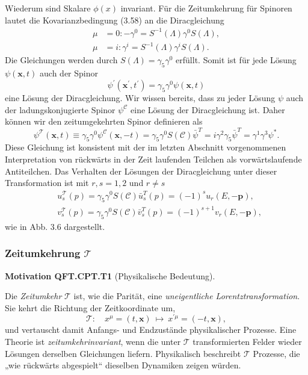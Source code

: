 \documentclass[10pt, letterpaper]{article}
\newcommand{\CustomHeading}[3]{%
  \par\medskip\noindent%
  \textbf{#1 #2} \textnormal{(#3)}.\enskip%
}
\newenvironment{MOT}[2]{\begin{unitbox}\CustomHeading{Motivation}{#1}{#2}}{\end{unitbox}}
\begin{document}
Wiederum sind Skalare $\phi(x)$ invariant. Für die Zeitumkehrung für Spinoren lautet die Kovarianzbedingung (3.58) an die Diracgleichung
$$
\begin{aligned}
\mu & =0:-\gamma^{0}=S^{-1}(\Lambda) \gamma^{0} S(\Lambda), \\
\mu & =i: \gamma^{i}=S^{-1}(\Lambda) \gamma^{i} S(\Lambda) .
\end{aligned}
$$
Die Gleichungen werden durch $S(\Lambda)=\gamma_{5} \gamma^{0}$ erfüllt. Somit ist für jede Lösung $\psi(\mathbf{x}, t)$ auch der Spinor
$$
\psi^{\prime}\left(\mathbf{x}^{\prime}, t^{\prime}\right)=\gamma_{5} \gamma^{0} \psi(\mathbf{x}, t)
$$
eine Lösung der Diracgleichung. Wir wissen bereits, dass zu jeder Lösung $\psi$ auch der ladungskonjugierte Spinor $\psi^{\mathcal{C}}$ eine Lösung der Diracgleichung ist. Daher können wir den zeitumgekehrten Spinor definieren als
$$
\psi^{\mathcal{T}}(\mathbf{x}, t) \equiv \gamma_{5} \gamma^{0} \psi^{\mathcal{C}}(\mathbf{x},-t)=\gamma_{5} \gamma^{0} S(\mathcal{C}) \bar{\psi}^{T}=i \gamma^{2} \gamma_{5} \bar{\psi}^{T}=\gamma^{1} \gamma^{3} \psi^{*} .
$$
Diese Gleichung ist konsistent mit der im letzten Abschnitt vorgenommenen Interpretation von rückwärts in der Zeit laufenden Teilchen als vorwärtslaufende Antiteilchen. Das Verhalten der Lösungen der Diracgleichung unter dieser Transformation ist mit $r, s=1,2$ und $r \neq s$
$$
\begin{aligned}
& u_{s}^{\mathcal{T}}(p)=\gamma_{5} \gamma^{0} S(\mathcal{C}) \bar{u}_{s}^{T}(p)=(-1)^{s} u_{r}(E,-\mathbf{p}), \\
& v_{s}^{\mathcal{T}}(p)=\gamma_{5} \gamma^{0} S(\mathcal{C}) \bar{v}_{s}^{T}(p)=(-1)^{s+1} v_{r}(E,-\mathbf{p}),
\end{aligned}
$$
wie in Abb. 3.6 dargestellt.

\subsubsection{Zeitumkehrung $\mathcal T$}

\begin{MOT}{QFT.CPT.T1}{Physikalische Bedeutung}
Die \emph{Zeitumkehr} $\mathcal T$ ist, wie die Parität, eine \emph{uneigentliche Lorentztransformation}.  
Sie kehrt die Richtung der Zeitkoordinate um,
\[
\mathcal T:\quad x^\mu=(t,\mathbf x)\ \longmapsto\ x^{\prime\mu}=(-t,\mathbf x),
\]
und vertauscht damit Anfangs- und Endzustände physikalischer Prozesse.  
Eine Theorie ist \emph{zeitumkehrinvariant}, wenn die unter $\mathcal T$ transformierten Felder wieder Lösungen derselben Gleichungen liefern.  
Physikalisch beschreibt $\mathcal T$ Prozesse, die „wie rückwärts abgespielt“ dieselben Dynamiken zeigen würden.
\end{MOT}
\end{document}
